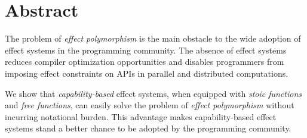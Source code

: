 \section*{\centering Abstract}

The problem of \emph{effect polymorphism} is the main obstacle to the
wide adoption of effect systems in the programming community. The
absence of effect systems reduces compiler optimization opportunities
and disables programmers from imposing effect constraints on APIs in
parallel and distributed computations.

We show that \emph{capability-based} effect systems, when equipped
with \emph{stoic functions} and \emph{free functions}, can easily
solve the problem of \emph{effect polymorphism} without incurring
notational burden. This advantage makes capability-based effect
systems stand a better chance to be adopted by the programming
community.
